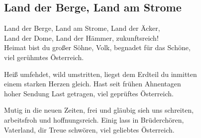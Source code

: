 
\subsection*{Land der Berge, Land am Strome}
%
%

\thestrophe Land der Berge, Land am Strome, Land der Äcker, \\
Land der Dome, Land der Hämmer, zukunftsreich! \\
Heimat bist du großer Söhne, Volk, begnadet für das Schöne, \\
viel gerühmtes Österreich. 

\thestrophe Heiß umfehdet, wild umstritten, liegst dem Erdteil du inmitten \\
einem starken Herzen gleich. Hast seit frühen Ahnentagen \\
hoher Sendung Last getragen, viel geprüftes Österreich. \\

\thestrophe Mutig in die neuen Zeiten, frei und gläubig sieh uns schreiten, \\
arbeitsfroh und hoffnungsreich. Einig lass in Brüderchören, \\
Vaterland, dir Treue schwören, viel geliebtes Österreich. \\
